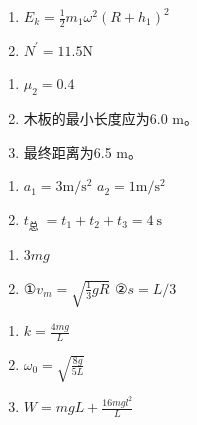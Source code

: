\item \begin {enumerate} \renewcommand {\labelenumi }{\arabic {enumi}.} \item $E_{k}=\frac {1}{2} m_{1} \omega ^{2}\left (R+h_{1}\right )^{2}$ \item $N^{\prime }=11.5 \mathrm {N}$ \par \end {enumerate} \par \par 
\item \begin {enumerate} \renewcommand {\labelenumi }{\arabic {enumi}.} \item $\mu _{2}=0.4$ \par \item 木板的最小长度应为6.0 m。 \par \item 最终距离为6.5 m。 \par \end {enumerate} \par \par 
\item \begin {enumerate} \renewcommand {\labelenumi }{\arabic {enumi}.} \item $a_{1}=3 \mathrm {m} / \mathrm {s}^{2}$ \qquad $a_{2}=1 \mathrm {m} / \mathrm {s}^{2}$ \par \item $t_{\text {总 }}=t_{1}+t_{2}+t_{3}=4 \ \mathrm {s}$ \end {enumerate} \par \par 
\item \begin {enumerate} \renewcommand {\labelenumi }{\arabic {enumi}.} \item $3 m g$ \item ①$v_{m}=\sqrt {\frac {1}{3} g R}$ \qquad ②$s=L / 3$ \par \par \par \end {enumerate} \par \par 
\item \begin {enumerate} \renewcommand {\labelenumi }{\arabic {enumi}.} \item $ k=\frac {4 m g}{L}$ \item $\omega _{0}=\sqrt {\frac {8 g}{5 L}}$ \item $W=m g L+\frac {16 m g l^{2}}{L}$ \par \par \par \end {enumerate} \par \par 
